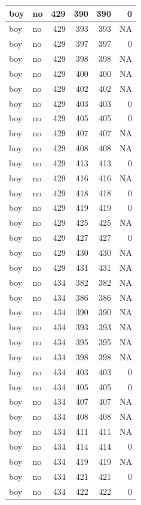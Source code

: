 \documentclass[man]{apa6}
\begin{document}
\begin{tabular}{l|l|r|r|r|r}
\hline
boy & no & 429 & 390 & 390 & 0\\
\hline
boy & no & 429 & 393 & 393 & NA\\
\hline
boy & no & 429 & 397 & 397 & 0\\
\hline
boy & no & 429 & 398 & 398 & NA\\
\hline
boy & no & 429 & 400 & 400 & NA\\
\hline
boy & no & 429 & 402 & 402 & NA\\
\hline
boy & no & 429 & 403 & 403 & 0\\
\hline
boy & no & 429 & 405 & 405 & 0\\
\hline
boy & no & 429 & 407 & 407 & NA\\
\hline
boy & no & 429 & 408 & 408 & NA\\
\hline
boy & no & 429 & 413 & 413 & 0\\
\hline
boy & no & 429 & 416 & 416 & NA\\
\hline
boy & no & 429 & 418 & 418 & 0\\
\hline
boy & no & 429 & 419 & 419 & 0\\
\hline
boy & no & 429 & 425 & 425 & NA\\
\hline
boy & no & 429 & 427 & 427 & 0\\
\hline
boy & no & 429 & 430 & 430 & NA\\
\hline
boy & no & 429 & 431 & 431 & NA\\
\hline
boy & no & 434 & 382 & 382 & NA\\
\hline
boy & no & 434 & 386 & 386 & NA\\
\hline
boy & no & 434 & 390 & 390 & NA\\
\hline
boy & no & 434 & 393 & 393 & NA\\
\hline
boy & no & 434 & 395 & 395 & NA\\
\hline
boy & no & 434 & 398 & 398 & NA\\
\hline
boy & no & 434 & 403 & 403 & 0\\
\hline
boy & no & 434 & 405 & 405 & 0\\
\hline
boy & no & 434 & 407 & 407 & NA\\
\hline
boy & no & 434 & 408 & 408 & NA\\
\hline
boy & no & 434 & 411 & 411 & NA\\
\hline
boy & no & 434 & 414 & 414 & 0\\
\hline
boy & no & 434 & 419 & 419 & NA\\
\hline
boy & no & 434 & 421 & 421 & 0\\
\hline
boy & no & 434 & 422 & 422 & 0\\

\end{tabular}
\end{document}
